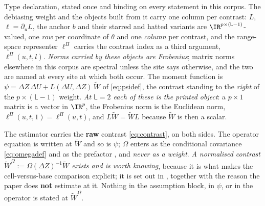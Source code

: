Type declaration, stated once and binding on every statement in this corpus. The debiasing
weight and the objects built from it carry one column per contrast: $L$, $\ell=\partial_uL$, the
anchor $b$ and their starred and hatted variants are $\IR^{p\times(\mathsf L-1)}$-valued, one
\emph{row} per coordinate of $\theta$ and one \emph{column} per contrast, and the range-space
representer $\ell^\Pi$ carries the contrast index as a third argument,
$\ell^\Pi(u,t,l)$. \emph{Norms carried by these objects are Frobenius}; matrix norms elsewhere in this
corpus are spectral unless the site says otherwise, and the two are named at every site at which both
occur. The moment function is
$\psi=\Delta Z\,\Delta U+L(\Delta U,\Delta Z)\,\widetilde W$ of \eqref{eq:psidef}, the contrast standing
to the \emph{right} of the $p\times(\mathsf L-1)$ weight. \emph{At $\mathsf L=2$ each of these is the
printed object}: a
$p\times1$ matrix is a vector in $\IR^{p}$, the Frobenius norm is the Euclidean norm,
$\ell^\Pi(u,t,1)=\ell^\Pi(u,t)$, and $L\widetilde W=\widetilde WL$ because $\widetilde W$ is then a
scalar.

The estimator carries the \textbf{raw} contrast \eqref{eq:contrast}, on both sides. The operator
equation is written at $\widetilde W$ and so is $\psi$; $\Omega$ enters as the conditional covariance
\eqref{eq:omegadef} and as the prefactor , and \emph{never as a weight}. \emph{A
normalised contrast $\widetilde W^{\Omega}:=\Omega(\Delta Z)^{-1}\widetilde W$ exists and is worth
knowing}, because it is what makes the cell-versus-base comparison explicit; it is set out in
, together with the reason the paper does \textbf{not} estimate at it. Nothing
in the assumption block, in $\psi$, or in the operator is stated at $\widetilde W^{\Omega}$.

